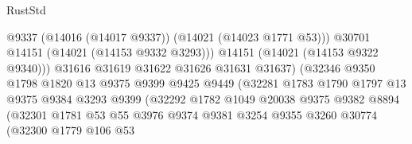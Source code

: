 \begin{lexlean}{RustStd}
\begin{coremodule}
                                            @9337
                                            (@14016 (@14017 @9337))
                                            (@14021 (@14023 @1771 @53)))
                                          @30701
                                          @14151
                                          (@14021 (@14153 @9332 @3293)))
                                        @14151
                                        (@14021 (@14153 @9322 @9340)))
                                      @31616
                                      @31619
                                      @31622
                                      @31626
                                      @31631
                                      @31637)
                                    (@32346
                                      @9350
                                      @1798
                                      @1820
                                      @13
                                      @9375
                                      @9399
                                      @9425
                                      @9449
                                      (@32281
                                        @1783
                                        @1790
                                        @1797
                                        @13
                                        @9375
                                        @9384
                                        @3293
                                        @9399
                                        (@32292
                                          @1782
                                          @1049
                                          @20038
                                          @9375
                                          @9382
                                          @8894
                                          (@32301
                                            @1781
                                            @53
                                            @55
                                            @3976
                                            @9374
                                            @9381
                                            @3254
                                            @9355
                                            @3260
                                            @30774
                                            (@32300
                                              @1779
                                              @106
                                              @53

\end{coremodule}
\end{lexlean}
